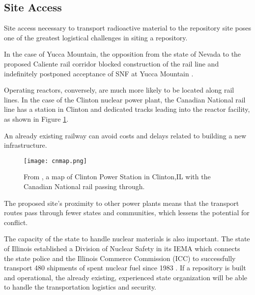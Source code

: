 	 

\subsection{Site Access}




Site access necessary to transport radioactive material to the repository site 
poses one of the greatest logistical challenges in siting a repository. 

In the case of Yucca Mountain, 
the opposition from the state of Nevada to the proposed Caliente rail corridor 
blocked construction of the rail line and indefinitely postponed
acceptance of \gls{SNF} at Yucca Mountain \cite{halstead_yucca_2011}.

Operating reactors, conversely, are much more likely to be located along rail 
lines. In the case of the Clinton nuclear power plant, 
the Canadian National rail line \cite{waleed_regional_2015} has a station in 
Clinton and dedicated tracks leading into the reactor facility, as shown in 
Figure \ref{fig:cnmap}.

An already existing railway can avoid costs and delays related to building a 
new infrastructure.

\begin{figure}[!h] 
  \centering
  \texttt{[image: cnmap.png]}	
        \caption{From \cite{canadian_national_railway_company_canadian_2016}, a map of Clinton Power Station in Clinton,IL
        with the Canadian National rail passing through.}
  \label{fig:cnmap}
\end{figure}

The proposed site's proximity to other power plants means that the transport
routes pass through fewer states and communities, which lessens the potential 
for conflict.

The capacity of the state to handle nuclear materials is also important.
The state of Illinois established a Division of Nuclear Safety in its \gls{IEMA}
which connects the state police and the Illinois Commerce Commission (ICC) to
 successfully transport 480 shipments of spent nuclear fuel since 1983
 \cite{iema_illinois_2005}. If a repository is built and operational, the already existing,
 experienced state organization will be able to handle the transportation logistics
 and security.  

